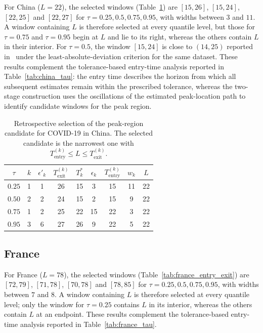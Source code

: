 \documentclass[12pt,a4paper]{article}
\begin{document}
For China ($L=22$), the selected windows
(Table~\ref{tab:china_entry_exit}) are $[15,26]$, $[15,24]$, $[22,25]$
and $[22,27]$ for $\tau=0.25,0.5,0.75,0.95$, with widths between $3$
and $11$. A window containing $L$ is therefore selected at every
quantile level, but those for $\tau=0.75$ and $\tau=0.95$ begin at $L$
and lie to its right, whereas the others contain $L$ in their
interior. For $\tau=0.5$, the window $[15,24]$ is close to $(14,25)$
reported in~\citet{Der25} under the least-absolute-deviation criterion
for the same dataset.
These results complement the tolerance-based entry-time analysis reported in Table~\ref{tab:china_tau}: the entry time describes the horizon from which all subsequent estimates remain within the prescribed tolerance, whereas the two-stage construction uses the oscillations of the estimated peak-location path to identify candidate windows for the peak region.

\begin{table}[htbp]
	\centering
	\caption{Retrospective selection of the peak-region candidate for
		COVID-19 in China.
		The selected candidate is the narrowest one with
		$T_{\mathrm{entry}}^{(k)}\le L\le T_{\mathrm{exit}}^{(k)}$.}
	\label{tab:china_entry_exit}
	\begin{tabular}{c|cccccccc}
		\toprule
		$\tau$ &
		$k$ &
		$\epsilon'_k$ &
		$T_{\mathrm{exit}}^{(k)}$ &
		$T_k^*$ &
		$\epsilon_k$ &
		$T_{\mathrm{entry}}^{(k)}$ &
		$w_k$ &
		$L$ \\
		\midrule
		$0.25$ & 1 & 1  & 26 & 15 & 3  & 15 & 11 & 22 \\
		$0.50$ & 2 & 2  & 24 & 15 & 2  & 15 & 9  & 22 \\
		$0.75$ & 1 & 2  & 25 & 22 & 15 & 22 & 3 & 22 \\
		$0.95$ & 3 & 6 & 27 & 26 & 9 & 22 & 5 & 22 \\
		\bottomrule
	\end{tabular}
\end{table}

\subsection{France}
\label{subsec:france}

For France ($L=78$), the selected windows
(Table~\ref{tab:france_entry_exit}) are $[72,79]$, $[71,78]$, $[70,78]$
and $[78,85]$ for $\tau=0.25,0.5,0.75,0.95$, with widths between $7$
and $8$. A window containing $L$ is therefore selected at every
quantile level; only the window for $\tau=0.25$ contains $L$ in its
interior, whereas the others contain $L$ at an endpoint.
These results complement the tolerance-based entry-time analysis reported in Table~\ref{tab:france_tau}.
\end{document}
